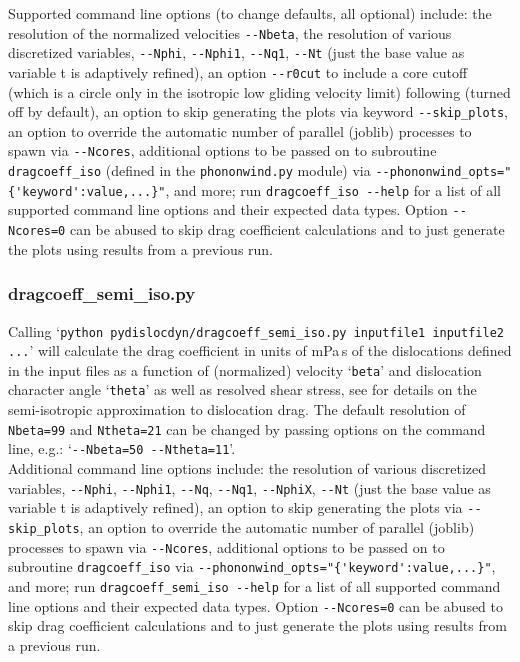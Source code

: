\documentclass[11pt,letterpaper,oneside]{article}
\begin{document}
Supported command line options (to change defaults, all optional) include:
the resolution of the normalized velocities \verb|--Nbeta|,
the resolution of various discretized variables, \verb|--Nphi|, \verb|--Nphi1|, \verb|--Nq1|, \verb|--Nt| (just the base value as variable t is adaptively refined),
an option \verb|--r0cut| to include a core cutoff (which is a circle only in the isotropic low gliding velocity limit) following \cite{Alshits:1979} (turned off by default),
an option to skip generating the plots via keyword \verb|--skip_plots|,
an option to override the automatic number of parallel (joblib) processes to spawn via \verb|--Ncores|,
additional options to be passed on to subroutine \verb|dragcoeff_iso| (defined in the \verb|phononwind.py| module) via \verb|--phononwind_opts="{'keyword':value,...}"|,
and more; run \verb|dragcoeff_iso --help| for a list of all supported command line options and their expected data types.
Option \verb|--Ncores=0| can be abused to skip drag coefficient calculations and to just generate the plots using results from a previous run.



\subsubsection{dragcoeff\_semi\_iso.py}

Calling `\verb|python pydislocdyn/dragcoeff_semi_iso.py inputfile1 inputfile2 ...|' will calculate the drag coefficient in units of mPa\,s of the dislocations defined in the input files as a function of (normalized) velocity `\verb|beta|' and dislocation character angle `\verb|theta|' as well as resolved shear stress, see \cite{Blaschke:2018anis,Blaschke:2019fits,Blaschke:2021impact} for details on the semi-isotropic approximation to dislocation drag.
The default resolution of \verb|Nbeta=99| and \verb|Ntheta=21| can be changed by passing options on the command line, e.g.:
`\verb|--Nbeta=50 --Ntheta=11|'.\\
Additional command line options include:
the resolution of various discretized variables, \verb|--Nphi|, \verb|--Nphi1|, \verb|--Nq|, \verb|--Nq1|, \verb|--NphiX|, \verb|--Nt| (just the base value as variable t is adaptively refined),
an option to skip generating the plots via \verb|--skip_plots|,
an option to override the automatic number of parallel (joblib) processes to spawn via \verb|--Ncores|,
additional options to be passed on to subroutine \verb|dragcoeff_iso| via \verb|--phononwind_opts="{'keyword':value,...}"|,
and more; run \verb|dragcoeff_semi_iso --help| for a list of all supported command line options and their expected data types.
Option \verb|--Ncores=0| can be abused to skip drag coefficient calculations and to just generate the plots using results from a previous run.
\end{document}
